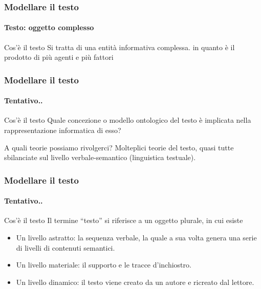 \begin{frame}
	\frametitle{Modellare il testo}
	\framesubtitle{Testo: oggetto complesso}
	\addtocounter{nframe}{1}

	\begin{block}{Cos'è il testo}
		Si tratta di una entità informativa complessa. in quanto è il prodotto di più agenti e più fattori
	\end{block}

\end{frame}

\begin{frame}
	\frametitle{Modellare il testo}
	\framesubtitle{Tentativo..}
	\addtocounter{nframe}{1}

	\begin{block}{Cos'è il testo}
		Quale concezione o modello ontologico del testo è implicata nella rappresentazione informatica di esso?
	\end{block}

	\begin{block}{A quali teorie possiamo rivolgerci?}
		Molteplici teorie del testo, quasi tutte sbilanciate sul livello verbale-semantico (linguistica testuale).
	\end{block}

\end{frame}

\begin{frame}
	\frametitle{Modellare il testo}
	\framesubtitle{Tentativo..}
	\addtocounter{nframe}{1}

	\begin{block}{Cos'è il testo}
		Il termine ``testo''  si riferisce a un oggetto plurale, in cui esiste
		\begin{itemize}
			\item Un livello astratto: la sequenza verbale, la quale a sua volta genera una serie di livelli di contenuti semantici.
			\item Un livello materiale: il supporto e le tracce d’inchiostro.
			\item Un livello dinamico: il testo viene creato da un autore e ricreato dal lettore.
		\end{itemize}

	\end{block}

\end{frame}



